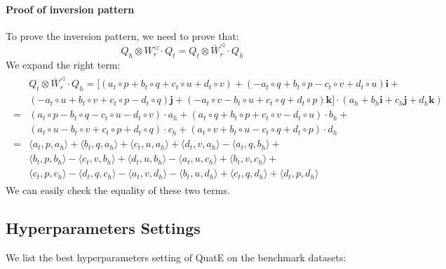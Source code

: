 \documentclass{article}
\begin{document}
\paragraph{Proof of inversion pattern} To prove the inversion pattern, we need to prove that:
\begin{equation}
     Q_h \otimes W_r^{\triangleleft} \cdot Q_t =  Q_t \otimes \bar{W}_r^{\triangleleft} \cdot Q_h
\end{equation}
We expand the right term:
\begin{align*}
\begin{split}
    &Q_t \otimes \bar{W}_r^{\triangleleft} \cdot Q_h =
    [( a_t\circ p + b_t\circ q + c_t\circ u + d_t\circ v )  + (- a_t\circ q + b_t\circ p - c_t\circ v + d_t\circ u) \textbf{i}
   + \\&(- a_t\circ u + b_t\circ v + c_t\circ p - d_t\circ q) \textbf{j} + (- a_t\circ v -  b_t\circ u + c_t\circ q + d_t\circ p) \textbf{k} ]
 \cdot (a_h + b_h \textbf{i} + c_h \textbf{j} + d_h \textbf{k})\\ =
   &( a_t\circ p - b_t\circ q - c_t\circ u - d_t\circ v ) \cdot a_h + (a_t\circ q + b_t\circ p + c_t\circ v - d_t\circ u) \cdot b_h +  \\
   &(a_t\circ u - b_t\circ v + c_t\circ p + d_t\circ q) \cdot c_h + (a_t\circ v + b_t\circ u - c_t\circ q + d_t\circ p) \cdot d_h \\
   = &\langle a_t, p, a_h\rangle + \langle b_t, q, a_h \rangle+ \langle c_t, u, a_h\rangle + \langle d_t, v, a_h\rangle - \langle a_t, q ,b_h\rangle + \\ &\langle b_t, p, b_h \rangle- \langle c_t, v, b_h\rangle + \langle d_t, u ,b_h \rangle- \langle a_t, u, c_h\rangle + \langle b_t, v, c_h\rangle +\\ & \langle c_t, p, c_h\rangle - \langle d_t, q, c_h\rangle - \langle a_t, v, d_h\rangle - \langle b_t, u ,d_h\rangle + \langle c_t, q, d_h\rangle +\langle d_t, p ,d_h\rangle
\end{split}
\end{align*}
We can easily check the equality of these two terms.

\subsection{Hyperparameters Settings}
We list the best hyperparameters setting of QuatE on the benchmark datasets:
\end{document}
